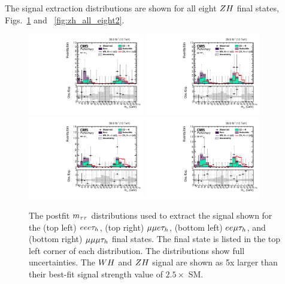 \clearpage


The signal extraction distributions are shown for all eight $ZH$ final states,
Figs.~\ref{fig:zh_all_eight1} and ~\ref{fig:zh_all_eight2}.

\begin{figure}[h!]
 \begin{center}
  \includegraphics[width=0.45\textwidth]{higgs_to_taus_vh/plots/zh/eeet_postfit.pdf}
  \includegraphics[width=0.45\textwidth]{higgs_to_taus_vh/plots/zh/emmt_postfit.pdf}
  \includegraphics[width=0.45\textwidth]{higgs_to_taus_vh/plots/zh/eemt_postfit.pdf}
  \includegraphics[width=0.45\textwidth]{higgs_to_taus_vh/plots/zh/mmmt_postfit.pdf}
 \end{center}
 \caption{The postfit $m_{\tau\tau}$ distributions used to extract the signal shown
  for the (top left) $eee\tau_{h}$, (top right) $\mu\mu e\tau_{h}$, 
  (bottom left) $ee\mu\tau_{h}$, and (bottom right) $\mu\mu\mu\tau_{h}$
  final states. The final state is listed in the
  top left corner of each distribution.
  The distributions show full uncertainties.
  The $WH$ and $ZH$ signal are shown as 5x larger than their best-fit
  signal strength value of $2.5 \times$ SM.
 }
 \label{fig:zh_all_eight1}
\end{figure}

